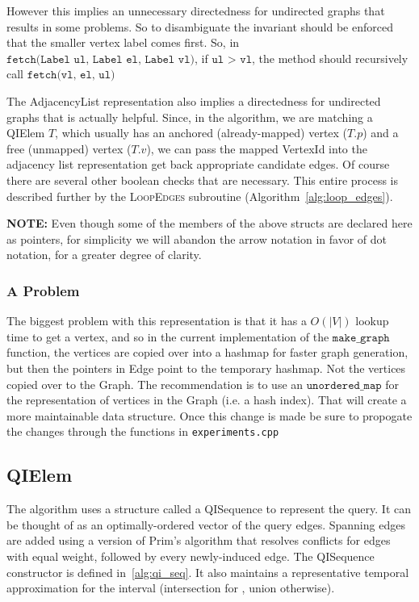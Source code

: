 However this implies an unnecessary directedness for undirected graphs that
results in some problems. So to disambiguate the invariant should be enforced
that the smaller vertex label comes first. So, in $\texttt{fetch(Label ul, Label
  el, Label vl)}$, if $\texttt{ul > vl}$, the method should recursively call
$\texttt{fetch(vl, el, ul)}$ 


The AdjacencyList representation also implies a directedness for undirected
graphs that is actually helpful. Since, in the algorithm, we are matching a
QIElem $T$, which usually has an anchored (already-mapped) vertex ($T.p$) and a
free (unmapped) vertex ($T.v$), we can pass the mapped VertexId into the
adjacency list representation get back appropriate candidate edges. Of course
there are several other boolean checks that are necessary. This entire process
is described further by the \textsc{LoopEdges} subroutine
(Algorithm~\ref{alg:loop_edges}).


\textbf{NOTE:} Even though some of the members of the above structs
are declared here as pointers, for simplicity we will abandon the
arrow notation in favor of dot notation, for a greater degree of clarity.


\subsubsection{A Problem}
The biggest problem with this representation is that it has a $O(|V|)$ lookup
time to get a vertex, and so in the current implementation of the
$\texttt{make\_graph}$ function, the vertices are copied over into a hashmap for
faster graph generation, but then the pointers in Edge point to the temporary
hashmap. Not the vertices copied over to the Graph. The recommendation is to use
an $\texttt{unordered\_map}$ for the representation of vertices in the Graph
(i.e. a hash index). That will create a more maintainable data structure. Once
this change is made be sure to propogate the changes through the functions in
\texttt{experiments.cpp}


\subsection{QIElem}

The algorithm uses a structure called a QISequence to represent the query. It
can be thought of as an optimally-ordered vector of the query edges. Spanning
edges are added using a version of Prim's algorithm that resolves conflicts for
edges with equal weight, followed by every newly-induced edge. The QISequence
constructor is defined in~\ref{alg:qi_seq}. It also maintains a representative
temporal approximation for the interval (intersection for \concur, union
otherwise).

